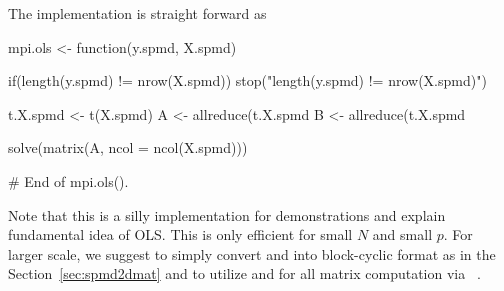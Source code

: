 The implementation is straight forward as
\begin{Code}[title=R Code]
mpi.ols <- function(y.spmd, X.spmd){
  if(length(y.spmd) != nrow(X.spmd)){
    stop("length(y.spmd) != nrow(X.spmd)")
  }

  t.X.spmd <- t(X.spmd)
  A <- allreduce(t.X.spmd %
  B <- allreduce(t.X.spmd %

  solve(matrix(A, ncol = ncol(X.spmd))) %
} # End of mpi.ols().

\end{Code}
Note that this is a silly implementation for demonstrations and
explain fundamental idea of OLS.
This is only efficient for small $N$ and small $p$. For larger scale,
we suggest to simply convert  and  into
block-cyclic format as in the Section~\ref{sec:spmd2dmat} and
to utilize  and  for all matrix computation
via ~\citep{Chen2012pbdSLAPpackage}.


